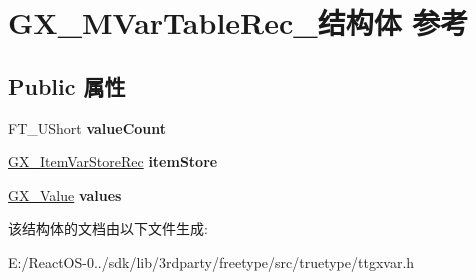 \hypertarget{struct_g_x___m_var_table_rec__}{}\section{G\+X\+\_\+\+M\+Var\+Table\+Rec\+\_\+结构体 参考}
\label{struct_g_x___m_var_table_rec__}
\subsection*{Public 属性}
\begin{DoxyCompactItemize}
\item 
\mbox{\label{struct_g_x___m_var_table_rec___ae9d58d8bf280c15369fbb2c957eea914}} 
F\+T\+\_\+\+U\+Short {\bfseries value\+Count}
\item 
\mbox{\label{struct_g_x___m_var_table_rec___acab1c475cb3efb16fe35163612b662b8}} 
\hyperlink{struct_g_x___item_var_store_rec__}{G\+X\+\_\+\+Item\+Var\+Store\+Rec} {\bfseries item\+Store}
\item 
\mbox{\label{struct_g_x___m_var_table_rec___a04bfb70450a5ea29e07b029a5d36b19e}} 
\hyperlink{struct_g_x___value_rec__}{G\+X\+\_\+\+Value} {\bfseries values}
\end{DoxyCompactItemize}


该结构体的文档由以下文件生成\+:\begin{DoxyCompactItemize}
\item 
E\+:/\+React\+O\+S-\/0../sdk/lib/3rdparty/freetype/src/truetype/ttgxvar.\+h\end{DoxyCompactItemize}
